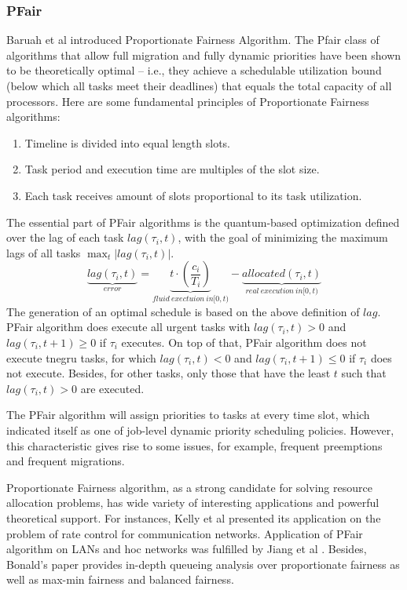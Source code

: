 \documentclass[preprint,12pt]{elsarticle}
\begin{document}
\subsubsection{PFair}
Baruah et al \cite{baruah1996proportionate} introduced Proportionate Fairness
Algorithm. 
The Pfair class of algorithms that allow full migration and fully dynamic
priorities have been shown to be theoretically optimal -- i.e., they achieve a
schedulable utilization bound (below which all tasks meet their deadlines)
that equals the total capacity of all processors. Here are some fundamental
principles of Proportionate Fairness algorithms: 

\begin{enumerate}
    \item Timeline is divided into equal length slots. 
    \item Task period and execution time are multiples of the slot size. 
    \item Each task receives amount of slots proportional to its task
        utilization. 
\end{enumerate}

The essential part of PFair algorithms is the quantum-based optimization
defined over the lag of each task $lag(\tau_i, t)$, with the goal of
minimizing the maximum lags of all tasks $\max_t|lag(\tau_i, t)|$.
\begin{equation}
    \underbrace{lag(\tau_i, t)}_{error} = 
    \underbrace{t \cdot (\frac{c_i}{T_i})}_{fluid\ exectuion\ in [0,t)} 
    - \underbrace{allocated(\tau_i, t)}_{real\ execution\ in [0,t)}
\end{equation}
The generation of an optimal schedule is based on the above definition of
$lag$. PFair algorithm does execute all urgent tasks with $lag(\tau_i, t) > 0$
and $lag(\tau_i, t +1) \geq 0$ if $\tau_i$ executes. 
On top of that, PFair algorithm does not execute tnegru tasks, for which
$lag(\tau_i, t) < 0$ and $lag(\tau_i, t+1) \leq 0$ if $\tau_i$ does not execute.  
Besides, for other tasks, only those that have the least $t$ such that
$lag(\tau_i,t) >0$ are executed.

The PFair algorithm will assign priorities to tasks at every time slot, which
indicated itself as one of job-level dynamic priority scheduling policies. 
However, this characteristic gives rise to some issues, for example, frequent
preemptions and frequent migrations.

Proportionate Fairness algorithm, as a strong candidate for solving
resource allocation problems, has wide variety of interesting applications and
powerful theoretical support. 
For instances, Kelly et al \cite{kelly1998rate} presented its application on
the problem of rate control for communication networks.  
Application of PFair algorithm on LANs and hoc networks was fulfilled by Jiang
et al \cite{jiang2005proportional}. Besides, Bonald's paper
\cite{bonald2006queueing} provides in-depth queueing analysis over proportionate
fairness as well as max-min fairness and balanced fairness. 
\end{document}
